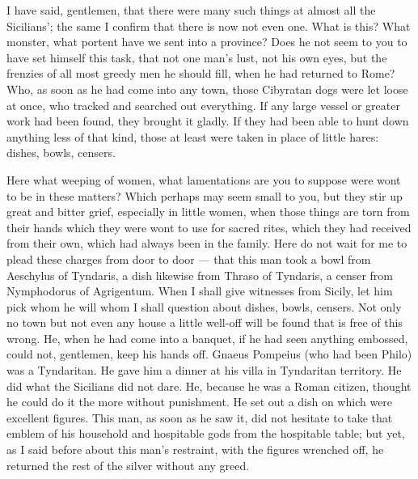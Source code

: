  I have said, gentlemen, that there were many such things at almost all the Sicilians'; the same I confirm that there is now not even one. What is this? What monster, what portent have we sent into a province? Does he not seem to you to have set himself this task, that not one man's lust, not his own eyes, but the frenzies of all most greedy men he should fill, when he had returned to Rome? Who, as soon as he had come into any town, those Cibyratan dogs were let loose at once, who tracked and searched out everything. If any large vessel or greater work had been found, they brought it gladly. If they had been able to hunt down anything less of that kind, those at least were taken in place of little hares: dishes, bowls, censers.

 Here what weeping of women, what lamentations are you to suppose were wont to be in these matters? Which perhaps may seem small to you, but they stir up great and bitter grief, especially in little women, when those things are torn from their hands which they were wont to use for sacred rites, which they had received from their own, which had always been in the family. Here do not wait for me to plead these charges from door to door --- that this man took a bowl from Aeschylus of Tyndaris, a dish likewise from Thraso of Tyndaris, a censer from Nymphodorus of Agrigentum. When I shall give witnesses from Sicily, let him pick whom he will whom I shall question about dishes, bowls, censers. Not only no town but not even any house a little well-off will be found that is free of this wrong. He, when he had come into a banquet, if he had seen anything embossed, could not, gentlemen, keep his hands off. Gnaeus Pompeius (who had been Philo) was a Tyndaritan. He gave him a dinner at his villa in Tyndaritan territory. He did what the Sicilians did not dare. He, because he was a Roman citizen, thought he could do it the more without punishment. He set out a dish on which were excellent figures. This man, as soon as he saw it, did not hesitate to take that emblem of his household and hospitable gods from the hospitable table; but yet, as I said before about this man's restraint, with the figures wrenched off, he returned the rest of the silver without any greed.


